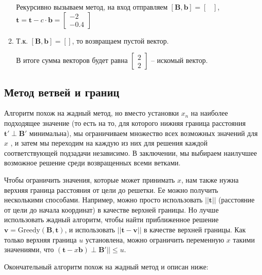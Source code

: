 \begin{enumerate}
Рекурсивно вызываем метод, на вход отправляем $ \left[\mathbf{B}, \mathbf{b}\right] = \left[\begin{array}{cccc}

\end{array}\right] $, $ \mathbf{t} = \mathbf{t} - c \cdot \mathbf{b} = \left[\begin{array}{cccc}
-2 \\
-0.4
\end{array}\right] $

\item 
Т.к. $ \left[\mathbf{B}, \mathbf{b}\right] = \left[ \right] $, то возвращаем пустой вектор.

В итоге сумма векторов будет равна $ \left[\begin{array}{cccc}
2 \\
2
\end{array}\right] $ -- искомый вектор.

\end{enumerate}

\subsection{Метод ветвей и границ}

Алгоритм похож на жадный метод, но вместо установки $ x_n $ на наиболее подходящее значение (то есть на то, для которого нижняя граница расстояния $ \mathbf{t}' \perp \mathbf{B}' $ минимальна), мы ограничиваем множество всех возможных значений для $ x $ , и затем мы переходим на каждую из них для решения каждой соответствующей подзадачи независимо. В заключении, мы выбираем наилучшее возможное решение среди возвращенных всеми ветками.

Чтобы ограничить значения, которые может принимать $ x $, нам также нужна верхняя граница расстояния от цели до решетки. Ее можно получить несколькими способами. Например, можно просто использовать $ ||\mathbf{t} || $ (расстояние от цели до начала координат) в качестве верхней границы. Но лучше использовать жадный алгоритм, чтобы найти приближенное решение $ \mathbf{v} = \text{Greedy}(\mathbf{B}, \mathbf{t}) $, и использовать $ || \mathbf{t} - \mathbf{v} || $ в качестве верхней границы. Как только верхняя граница $ u $  установлена, можно ограничить переменную $ x $ такими значениями, что $ (\mathbf{t} - x\mathbf{b}) \perp \mathbf{B}' || \leq u $.

Окончательный алгоритм похож на жадный метод и описан ниже: \newline

